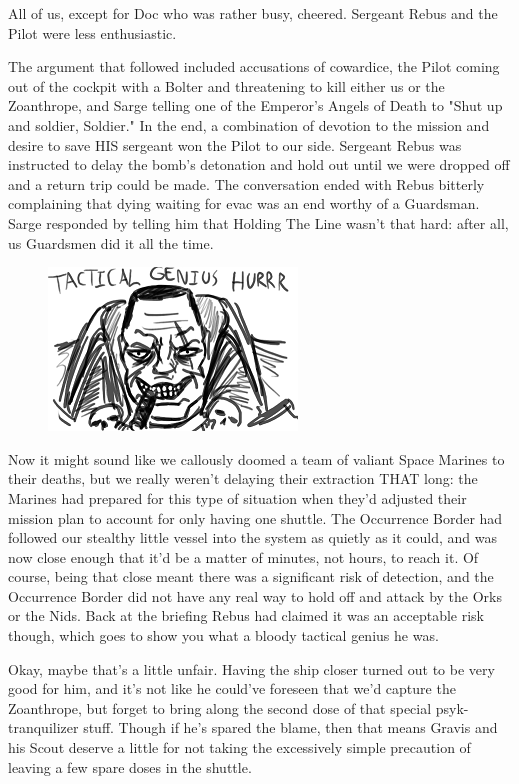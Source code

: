 All of us, except for Doc who was rather busy, cheered. 
Sergeant Rebus and the Pilot were less enthusiastic.

The argument that followed included accusations of cowardice, the Pilot coming out of the cockpit with a Bolter and threatening to kill either us or the Zoanthrope, and Sarge telling one of the Emperor's Angels of Death to "Shut up and soldier, Soldier." In the end, a combination of devotion to the mission and desire to save HIS sergeant won the Pilot to our side. 
Sergeant Rebus was instructed to delay the bomb's detonation and hold out until we were dropped off and a return trip could be made. 
The conversation ended with Rebus bitterly complaining that dying waiting for evac was an end worthy of a Guardsman. 
Sarge responded by telling him that Holding The Line wasn't that hard: 
after all, us Guardsmen did it all the time.
\begin{figure}
	\begin{center}
		\includegraphics[width=\figwidth]{pics/12/60.png}
	\end{center}
\end{figure}
Now it might sound like we callously doomed a team of valiant Space Marines to their deaths, but we really weren't delaying their extraction THAT long: 
the Marines had prepared for this type of situation when they'd adjusted their mission plan to account for only having one shuttle. 
The Occurrence Border had followed our stealthy little vessel into the system as quietly as it could, and was now close enough that it'd be a matter of minutes, not hours, to reach it. 
Of course, being that close meant there was a significant risk of detection, and the Occurrence Border did not have any real way to hold off and attack by the Orks or the Nids. 
Back at the briefing Rebus had claimed it was an acceptable risk though, which goes to show you what a bloody tactical genius he was.

Okay, maybe that's a little unfair. 
Having the ship closer turned out to be very good for him, and it's not like he could've foreseen that we'd capture the Zoanthrope, but forget to bring along the second dose of that special psyk-tranquilizer stuff. 
Though if he's spared the blame, then that means Gravis and his Scout deserve a little for not taking the excessively simple precaution of leaving a few spare doses in the shuttle. 



